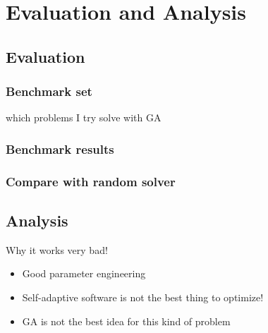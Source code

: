 \chapter{Evaluation and Analysis}

\section{Evaluation}
\subsection{Benchmark set}
which problems I try solve with GA

\subsection{Benchmark results}
\subsection{Compare with random solver}

\section{Analysis}
Why it works very bad!
\begin{itemize}
	\item Good parameter engineering 
	\item Self-adaptive software is not the best thing to optimize!
	\item GA is not the best idea for this kind of problem
\end{itemize}